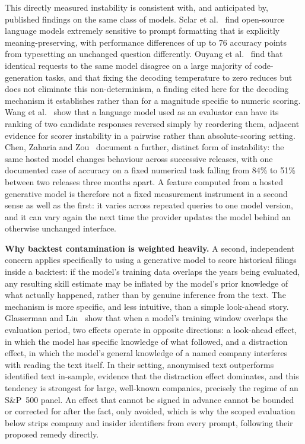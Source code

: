 \documentclass[logo,msc,ai]{infthesis}        %
\begin{document}
This directly measured instability is consistent with, and anticipated by, published findings on the same class of models. Sclar et al.\ \cite{sclar2024quantifying} find open-source language models extremely sensitive to prompt formatting that is explicitly meaning-preserving, with performance differences of up to 76 accuracy points from typesetting an unchanged question differently. Ouyang et al.\ \cite{ouyang2025empirical} find that identical requests to the same model disagree on a large majority of code-generation tasks, and that fixing the decoding temperature to zero reduces but does not eliminate this non-determinism, a finding cited here for the decoding mechanism it establishes rather than for a magnitude specific to numeric scoring. Wang et al.\ \cite{wang2024large} show that a language model used as an evaluator can have its ranking of two candidate responses reversed simply by reordering them, adjacent evidence for scorer instability in a pairwise rather than absolute-scoring setting. Chen, Zaharia and Zou~\cite{Chen2024How} document a further, distinct form of instability: the same hosted model changes behaviour across successive releases, with one documented case of accuracy on a fixed numerical task falling from 84\% to 51\% between two releases three months apart. A feature computed from a hosted generative model is therefore not a fixed measurement instrument in a second sense as well as the first: it varies across repeated queries to one model version, and it can vary again the next time the provider updates the model behind an otherwise unchanged interface.

\textbf{Why backtest contamination is weighted heavily.} A second, independent concern applies specifically to using a generative model to score historical filings inside a backtest: if the model's training data overlaps the years being evaluated, any resulting skill estimate may be inflated by the model's prior knowledge of what actually happened, rather than by genuine inference from the text. The mechanism is more specific, and less intuitive, than a simple look-ahead story. Glasserman and Lin~\cite{glasserman2024lookahead} show that when a model's training window overlaps the evaluation period, two effects operate in opposite directions: a look-ahead effect, in which the model has specific knowledge of what followed, and a distraction effect, in which the model's general knowledge of a named company interferes with reading the text itself. In their setting, anonymised text outperforms identified text in-sample, evidence that the distraction effect dominates, and this tendency is strongest for large, well-known companies, precisely the regime of an S\&P~500 panel. An effect that cannot be signed in advance cannot be bounded or corrected for after the fact, only avoided, which is why the scoped evaluation below strips company and insider identifiers from every prompt, following their proposed remedy directly.
\end{document}
